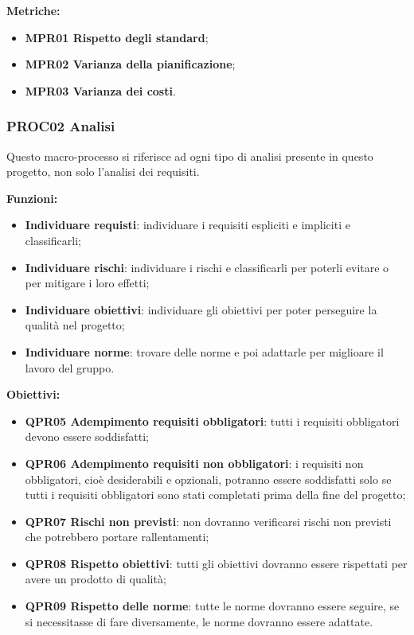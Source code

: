 \documentclass[../piano_di_qualifica.tex]{subfiles}
\begin{document}
\textbf{Metriche:}
\smallbreak
\begin{itemize}
	\item \textbf{MPR01 Rispetto degli standard};
	\item \textbf{MPR02 Varianza della pianificazione};
	\item \textbf{MPR03 Varianza dei costi}.
\end{itemize}

\subsubsection{PROC02 Analisi}
Questo macro-processo si riferisce ad ogni tipo di analisi presente in questo progetto, non solo l'analisi dei requisiti.

\textbf{Funzioni:}
\smallbreak
\begin{itemize}
	\item \textbf{Individuare requisti}: individuare i requisiti espliciti e impliciti e classificarli;
	\item \textbf{Individuare rischi}: individuare i rischi e classificarli per poterli evitare o per mitigare i loro effetti;
	\item \textbf{Individuare obiettivi}: individuare gli obiettivi per poter perseguire la qualità nel progetto;
	\item \textbf{Individuare norme}: trovare delle norme e poi adattarle per miglioare il lavoro del gruppo.
\end{itemize}

\textbf{Obiettivi:}
\smallbreak
\begin{itemize}
	\item \textbf{QPR05 Adempimento requisiti obbligatori}: tutti i requisiti obbligatori devono essere soddisfatti;
	\item \textbf{QPR06 Adempimento requisiti non obbligatori}: i requisiti non obbligatori, cioè desiderabili e opzionali, potranno essere soddisfatti solo se tutti i requisiti obbligatori sono stati completati prima della fine del progetto;
	\item \textbf{QPR07 Rischi non previsti}: non dovranno verificarsi rischi non previsti che potrebbero portare rallentamenti;
	\item \textbf{QPR08 Rispetto obiettivi}: tutti gli obiettivi dovranno essere rispettati per avere un prodotto di qualità;
	\item \textbf{QPR09 Rispetto delle norme}: tutte le norme dovranno essere seguire, se si necessitasse di fare diversamente, le norme dovranno essere adattate.
\end{itemize}
\end{document}
